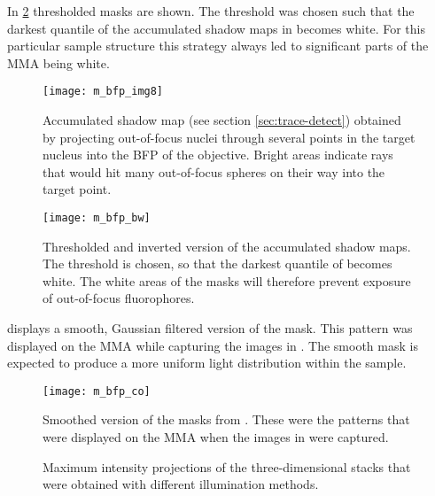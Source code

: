 In \ref{fig:m_bfp_bw} thresholded masks are shown. The threshold was
chosen such that the darkest quantile of the accumulated shadow maps
in  becomes white. For this particular sample
structure this strategy always led to significant parts of the MMA
being white.

\begin{figure}[H]
  \centering
  \texttt{[image: m\_bfp\_img8]}
  \caption{Accumulated shadow map (see section \ref{sec:trace-detect})
    obtained by projecting out-of-focus nuclei through several points
    in the target nucleus into the BFP of the objective. Bright areas
    indicate rays that would hit many out-of-focus spheres on their
    way into the target point.}
  \label{fig:m_bfp_img8}
\end{figure}

\begin{figure}[H]
  \centering
  \texttt{[image: m\_bfp\_bw]}
  \caption{Thresholded and inverted version of the accumulated shadow
    maps. The threshold is chosen, so that the darkest quantile of
     becomes white. The white areas of the
    masks will therefore prevent exposure of out-of-focus
    fluorophores.}
  \label{fig:m_bfp_bw}
\end{figure}

 displays a smooth, Gaussian filtered version of
the mask. This pattern was displayed on the MMA while capturing the
images in . The smooth mask is expected to
produce a more uniform light distribution within the sample.


\begin{figure}[H]
  \centering
  \texttt{[image: m\_bfp\_co]}
  \caption{Smoothed version of the masks from
    . These were the patterns that were displayed
    on the MMA when the images in  were captured.}
  \label{fig:m_bfp_co}
\end{figure}


\begin{figure}[H]
  \centering {}
  \caption{Maximum intensity projections of the three-dimensional
    stacks that were obtained with different illumination methods.}
  \label{fig:mip}
\end{figure}


